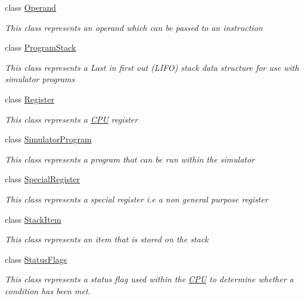 \begin{DoxyCompactItemize}
class \hyperlink{class_c_p_u___o_s___simulator_1_1_c_p_u_1_1_operand}{Operand}
\begin{DoxyCompactList}\small\item\em This class represents an operand which can be passed to an instruction \end{DoxyCompactList}\item 
class \hyperlink{class_c_p_u___o_s___simulator_1_1_c_p_u_1_1_program_stack}{Program\+Stack}
\begin{DoxyCompactList}\small\item\em This class represents a Last in first out (L\+I\+F\+O) stack data structure for use with simulator programs \end{DoxyCompactList}\item 
class \hyperlink{class_c_p_u___o_s___simulator_1_1_c_p_u_1_1_register}{Register}
\begin{DoxyCompactList}\small\item\em This class represents a \hyperlink{namespace_c_p_u___o_s___simulator_1_1_c_p_u}{C\+P\+U} register \end{DoxyCompactList}\item 
class \hyperlink{class_c_p_u___o_s___simulator_1_1_c_p_u_1_1_simulator_program}{Simulator\+Program}
\begin{DoxyCompactList}\small\item\em This class represents a program that can be run within the simulator \end{DoxyCompactList}\item 
class \hyperlink{class_c_p_u___o_s___simulator_1_1_c_p_u_1_1_special_register}{Special\+Register}
\begin{DoxyCompactList}\small\item\em This class represents a special register i.\+e a non general purpose register \end{DoxyCompactList}\item 
class \hyperlink{class_c_p_u___o_s___simulator_1_1_c_p_u_1_1_stack_item}{Stack\+Item}
\begin{DoxyCompactList}\small\item\em This class represents an item that is stored on the stack \end{DoxyCompactList}\item 
class \hyperlink{class_c_p_u___o_s___simulator_1_1_c_p_u_1_1_status_flags}{Status\+Flags}
\begin{DoxyCompactList}\small\item\em This class represents a status flag used within the \hyperlink{namespace_c_p_u___o_s___simulator_1_1_c_p_u}{C\+P\+U} to determine whether a condition has been met. \end{DoxyCompactList}\end{DoxyCompactItemize}
